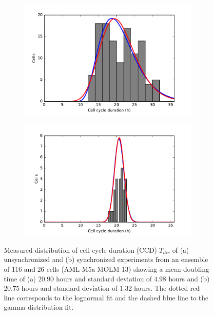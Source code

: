 \documentclass[pdftex,12pt,a4paper]{report}
\begin{document}
\begin{figure}[H]
\centering
\begin{subfigure}{.65\textwidth}
  \centering
  \includegraphics[width=\textwidth]{images/unsyn_cell_cycle_length_control.pdf}
  \caption{}
  \label{fig:ccd_unsyn}
\end{subfigure}
\begin{subfigure}{.65\textwidth}
  \centering
  \includegraphics[width=\textwidth]{images/syn_cell_cycle_length_control.pdf}
  \caption{}
  \label{fig:ccd_syn}
\end{subfigure}
\caption{Measured distribution of cell cycle duration (CCD) $T_{div}$ of (a) unsynchronized and (b) synchronized experiments from an ensemble of 116 and 26 cells (AML-M5a MOLM-13) showing a mean doubling time of (a) $20.90$ hours and standard deviation of $4.98$ hours and (b) $20.75$ hours and standard deviation of $1.32$ hours. The dotted red line corresponds to the lognormal fit and the dashed blue line to the gamma distribution fit.}
\label{fig:ccd_all}
\end{figure}
\end{document}
